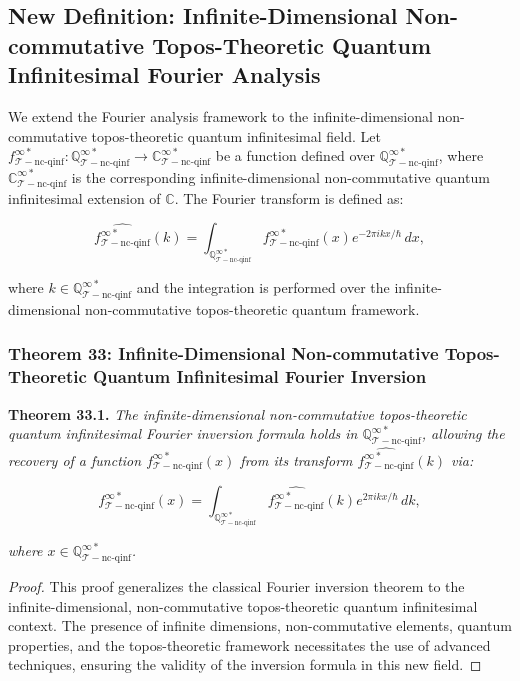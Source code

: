 \documentclass{article}
\begin{document}
\subsection{New Definition: Infinite-Dimensional Non-commutative Topos-Theoretic Quantum Infinitesimal Fourier Analysis}
We extend the Fourier analysis framework to the infinite-dimensional non-commutative topos-theoretic quantum infinitesimal field. Let \(f_{\mathcal{T}-\text{nc-qinf}}^{\infty *}: \mathbb{Q}_{\mathcal{T}-\text{nc-qinf}}^{\infty *} \to \mathbb{C}_{\mathcal{T}-\text{nc-qinf}}^{\infty *}\) be a function defined over \(\mathbb{Q}_{\mathcal{T}-\text{nc-qinf}}^{\infty *}\), where \(\mathbb{C}_{\mathcal{T}-\text{nc-qinf}}^{\infty *}\) is the corresponding infinite-dimensional non-commutative quantum infinitesimal extension of \(\mathbb{C}\). The Fourier transform is defined as:

\[
\widehat{f_{\mathcal{T}-\text{nc-qinf}}^{\infty *}}(k) = \int_{\mathbb{Q}_{\mathcal{T}-\text{nc-qinf}}^{\infty *}} f_{\mathcal{T}-\text{nc-qinf}}^{\infty *}(x) e^{-2\pi i k x / \hbar} \, dx,
\]

where \(k \in \mathbb{Q}_{\mathcal{T}-\text{nc-qinf}}^{\infty *}\) and the integration is performed over the infinite-dimensional non-commutative topos-theoretic quantum framework.

\subsubsection{Theorem 33: Infinite-Dimensional Non-commutative Topos-Theoretic Quantum Infinitesimal Fourier Inversion}
\textbf{Theorem 33.1.} \textit{The infinite-dimensional non-commutative topos-theoretic quantum infinitesimal Fourier inversion formula holds in \(\mathbb{Q}_{\mathcal{T}-\text{nc-qinf}}^{\infty *}\), allowing the recovery of a function \(f_{\mathcal{T}-\text{nc-qinf}}^{\infty *}(x)\) from its transform \(\widehat{f_{\mathcal{T}-\text{nc-qinf}}^{\infty *}}(k)\) via:}

\[
f_{\mathcal{T}-\text{nc-qinf}}^{\infty *}(x) = \int_{\mathbb{Q}_{\mathcal{T}-\text{nc-qinf}}^{\infty *}} \widehat{f_{\mathcal{T}-\text{nc-qinf}}^{\infty *}}(k) e^{2\pi i k x / \hbar} \, dk,
\]

\textit{where \(x \in \mathbb{Q}_{\mathcal{T}-\text{nc-qinf}}^{\infty *}\).}

\begin{proof}
This proof generalizes the classical Fourier inversion theorem to the infinite-dimensional, non-commutative topos-theoretic quantum infinitesimal context. The presence of infinite dimensions, non-commutative elements, quantum properties, and the topos-theoretic framework necessitates the use of advanced techniques, ensuring the validity of the inversion formula in this new field.
\end{proof}
\end{document}
